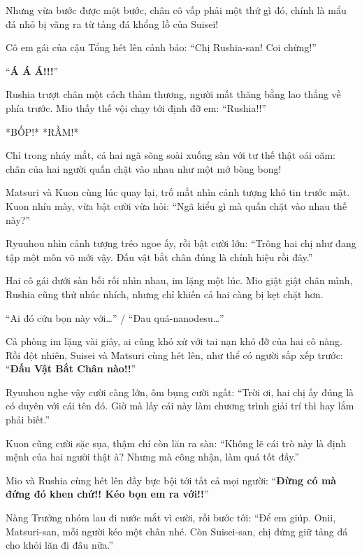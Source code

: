 \documentclass[../main.tex]{subfiles}
\begin{document}
Nhưng vừa bước được một bước, chân cô vấp phải một thứ gì đó, chính là mẩu đá nhỏ bị văng ra từ tảng đá khổng lồ của Suisei!

Cô em gái của cậu Tổng hét lên cảnh báo: ``Chị Rushia-san! Coi chừng!''

``\textbf{Á Á Á!!!}''


Rushia trượt chân một cách thảm thương, người mất thăng bằng lao thẳng về phía trước. Mio thấy thế vội chạy tới định đỡ em: ``Rushia!!''

*BỐP!* *RẦM!*

Chỉ trong nháy mắt, cả hai ngã sõng soài xuống sàn với tư thế thật oái oăm: chân của hai người quấn chặt vào nhau như một mớ bòng bong!


Matsuri và Kuon cùng lúc quay lại, trố mắt nhìn cảnh tượng khó tin trước mặt. Kuon nhíu mày, vừa bật cười vừa hỏi: ``Ngã kiểu gì mà quấn chặt vào nhau thế này?''

Ryuuhou nhìn cảnh tượng tréo ngoe ấy, rồi bật cười lớn: ``Trông hai chị như đang tập một môn võ mới vậy. Đấu vật bắt chân đúng là chính hiệu rồi đây.''

Hai cô gái dưới sàn bối rối nhìn nhau, im lặng một lúc. Mio giật giật chân mình, Rushia cũng thử nhúc nhích, nhưng chỉ khiến cả hai càng bị kẹt chặt hơn.

``Ai đó cứu bọn này với\dots'' / ``Đau quá-nanodesu\dots''

Cả phòng im lặng vài giây, ai cũng khó xử với tai nạn khó đỡ của hai cô nàng. Rồi đột nhiên, Suisei và Matsuri cùng hét lên, như thể có người sắp xếp trước: ``\textbf{Đấu Vật Bắt Chân nào!!}''


Ryuuhou nghe vậy cười càng lớn, ôm bụng cười ngất: ``Trời ơi, hai chị ấy đúng là có duyên với cái tên đó. Giờ mà lấy cái này làm chương trình giải trí thì hay lắm phải biết.''

Kuon cũng cười sặc sụa, thậm chí còn lăn ra sàn: ``Không lẽ cái trò này là định mệnh của hai người thật à? Nhưng mà công nhận, làm quá tốt đấy.''

Mio và Rushia cùng hét lên đầy bực bội tới tất cả mọi người: ``\textbf{Đừng có mà đứng đó khen chứ!! Kéo bọn em ra với!!}''

Nàng Trưởng nhóm lau đi nước mắt vì cười, rồi bước tới: ``Để em giúp. Onii, Matsuri-san, mỗi người kéo một chân nhé. Còn Suisei-san, chị đứng giữ tảng đá cho khỏi lăn đi đâu nữa.''
\end{document}

